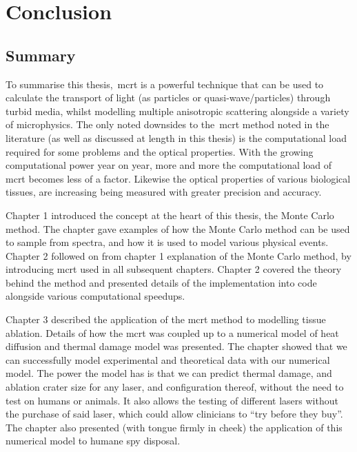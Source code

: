 \chapter{Conclusion}

\section{Summary}

To summarise this thesis,~\gls*{mcrt} is a powerful technique that can be used to calculate the transport of light (as particles or quasi-wave/particles) through turbid media, whilst modelling multiple anisotropic scattering alongside a variety of microphysics.
The only noted downsides to the~\gls*{mcrt} method noted in the literature (as well as discussed at length in this thesis) is the computational load required for some problems and the optical properties.
With the growing computational power year on year, more and more the computational load of \gls*{mcrt} becomes less of a factor.
Likewise the optical properties of various biological tissues, are increasing being measured with greater precision and accuracy.

\medskip

Chapter 1 introduced the concept at the heart of this thesis, the Monte Carlo method.
The chapter gave examples of how the Monte Carlo method can be used to sample from spectra, and how it is used to model various physical events.
Chapter 2 followed on from chapter 1 explanation of the Monte Carlo method, by introducing \gls*{mcrt} used in all subsequent chapters.
Chapter 2 covered the theory behind the method and presented details of the implementation into code alongside various computational speedups.

\medskip

Chapter 3 described the application of the \gls*{mcrt} method to modelling tissue ablation.
Details of how the \gls*{mcrt} was coupled up to a numerical model of heat diffusion and thermal damage model was presented.
The chapter showed that we can successfully model experimental and theoretical data with our numerical model.
The power the model has is that we can predict thermal damage, and ablation crater size for any laser, and configuration thereof, without the need to test on humans or animals.
It also allows the testing of different lasers without the purchase of said laser, which could allow clinicians to ``try before they buy''.
The chapter also presented (with tongue firmly in cheek) the application of this numerical model to humane spy disposal.

